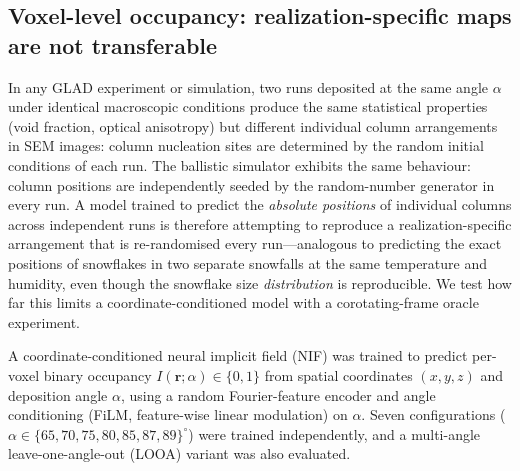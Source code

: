 \documentclass[aip,amsmath,amssymb,reprint]{revtex4-1}
\newcommand{\dang}{\ensuremath{\alpha}}
\begin{document}
\subsection{Voxel-level occupancy: realization-specific maps are not transferable}
\label{ssec:nif_voxel}

In any GLAD experiment or simulation, two runs deposited at the same
angle $\dang$ under identical macroscopic conditions produce the same
statistical properties (void fraction, optical anisotropy) but different
individual column arrangements in SEM images: column nucleation sites
are determined by the random initial conditions of each run.
The ballistic simulator exhibits the same behaviour: column positions
are independently seeded by the random-number generator in every run.
A model trained to predict the \textit{absolute positions} of individual
columns across independent runs is therefore attempting to reproduce a
realization-specific arrangement that is re-randomised every run---analogous
to predicting the exact positions of snowflakes in two separate snowfalls
at the same temperature and humidity, even though the snowflake size
\emph{distribution} is reproducible.
We test how far this limits a coordinate-conditioned model with a
corotating-frame oracle experiment.

A coordinate-conditioned neural implicit field (NIF) was trained to
predict per-voxel binary occupancy $I(\mathbf{r};\dang) \in \{0,1\}$
from spatial coordinates $(x,y,z)$ and deposition angle $\dang$,
using a random Fourier-feature encoder and angle conditioning
(FiLM, feature-wise linear modulation) on $\dang$.
Seven configurations ($\dang \in \{65, 70, 75, 80, 85, 87, 89\}^{\circ}$) were
trained independently, and a multi-angle leave-one-angle-out (LOOA)
variant was also evaluated.
\end{document}
